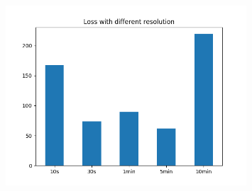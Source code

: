\documentclass[aspectratio=169,11pt,hyperref={colorlinks=true}]{beamer}
\begin{document}
\begin{frame}
\begin{columns}
\begin{center}
        \begin{figure}
          \includegraphics[width=0.8\textwidth,height=0.4\textheight]{graphs/loss_by_sampling-status.png}
        \end{figure}
      \end{center}
  \end{columns}
\end{frame}
\end{document}
